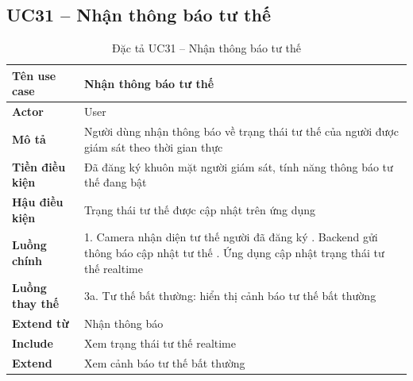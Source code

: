 \subsection*{UC31 -- Nhận thông báo tư thế}
\begin{table}[H]
    \captionsetup{justification=raggedright, singlelinecheck=false}
    \caption{Đặc tả UC31 -- Nhận thông báo tư thế}
\centering
\begin{tabular}{|p{3.5cm}|p{10cm}|}
\hline
\textbf{Tên use case} & Nhận thông báo tư thế \\
\hline
\textbf{Actor} & User \\
\hline
\textbf{Mô tả} & Người dùng nhận thông báo về trạng thái
  tư thế của người được giám sát theo thời gian thực \\
\hline
\textbf{Tiền điều kiện} & Đã đăng ký khuôn mặt người giám
  sát, tính năng thông báo tư thế đang bật \\
\hline
\textbf{Hậu điều kiện} & Trạng thái tư thế được cập nhật
  trên ứng dụng \\
\hline
\textbf{Luồng chính} &
  1. Camera nhận diện tư thế người đã đăng ký \newline
  2. Backend gửi thông báo cập nhật tư thế \newline
  3. Ứng dụng cập nhật trạng thái tư thế realtime \\
\hline
\textbf{Luồng thay thế} &
  3a. Tư thế bất thường: hiển thị cảnh báo
  tư thế bất thường \\
\hline
\textbf{Extend từ} & Nhận thông báo \\
\hline
\textbf{Include} & Xem trạng thái tư thế realtime \\
\hline
\textbf{Extend} & Xem cảnh báo tư thế bất thường \\
\hline
\end{tabular}

\end{table}

